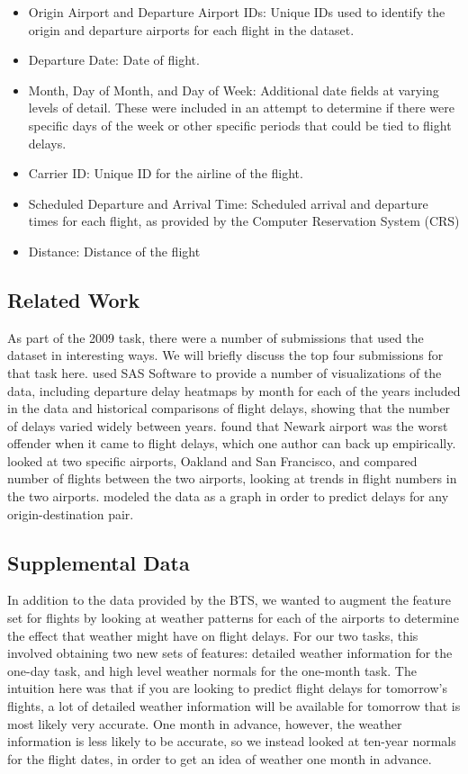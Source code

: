 \documentclass{article}
\begin{document}
\begin{itemize}
\item Origin Airport and Departure Airport IDs: Unique IDs used to identify the origin and departure airports for each flight in the dataset. 
\item Departure Date: Date of flight. 
\item Month, Day of Month, and Day of Week: Additional date fields at varying levels of detail. These were included in an attempt to determine if there were specific days of the week or other specific periods that could be tied to flight delays. 
\item Carrier ID: Unique ID for the airline of the flight.
\item Scheduled Departure and Arrival Time: Scheduled arrival and departure times for each flight, as provided by the Computer Reservation System (CRS)
\item Distance: Distance of the flight
\end{itemize}

\subsection{Related Work}

As part of the 2009 task, there were a number of submissions that used the dataset in interesting ways. We will briefly discuss the top four submissions for that task here. \cite{wicklin2009congestion} used SAS Software to provide a number of visualizations of the data, including departure delay heatmaps by month for each of the years included in the data and historical comparisons of flight delays, showing that the number of delays varied widely between years. \cite{hofmann2011delayed} found that Newark airport was the worst offender when it came to flight delays, which one author can back up empirically. \cite{wickham2011tale} looked at two specific airports, Oakland and San Francisco, and compared number of flights between the two airports, looking at trends in flight numbers in the two airports. \cite{dey2009minimizing} modeled the data as a graph in order to predict delays for any origin-destination pair.

\subsection{Supplemental Data}

In addition to the data provided by the BTS, we wanted to augment the feature set for flights by looking at weather patterns for each of the airports to determine the effect that weather might have on flight delays. For our two tasks, this involved obtaining two new sets of features: detailed weather information for the one-day task, and high level weather normals for the one-month task. The intuition here was that if you are looking to predict flight delays for tomorrow's flights, a lot of detailed weather information will be available for tomorrow that is most likely very accurate. One month in advance, however, the weather information is less likely to be accurate, so we instead looked at ten-year normals for the flight dates, in order to get an idea of weather one month in advance.
\end{document}
